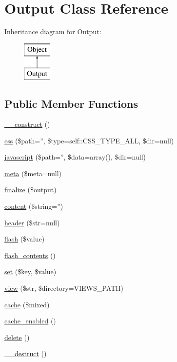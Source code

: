 \hypertarget{class_output}{
\section{Output Class Reference}
\label{class_output}
}
Inheritance diagram for Output:\begin{figure}[H]
\begin{center}
\leavevmode
\includegraphics[height=2.000000cm]{class_output}
\end{center}
\end{figure}
\subsection*{Public Member Functions}
\begin{DoxyCompactItemize}
\item 
\hyperlink{class_output_a095c5d389db211932136b53f25f39685}{\_\-\_\-construct} ()
\item 
\hyperlink{class_output_a81954b9eb41cfda9df0b6b866a92d6ba}{css} (\$path='', \$type=self::CSS\_\-TYPE\_\-ALL, \$dir=null)
\item 
\hyperlink{class_output_ac359bc09a619bc17984e72505da60e8a}{javascript} (\$path='', \$data=array(), \$dir=null)
\item 
\hyperlink{class_output_a53d74dafd94eb89bcb6eb54b9c5c39b5}{meta} (\$meta=null)
\item 
\hyperlink{class_output_a32fb85f301f99b6e61c5e19270983152}{finalize} (\$output)
\item 
\hyperlink{class_output_a3b9d33e5e0610124f62fb427ac1bd754}{content} (\$string='')
\item 
\hyperlink{class_output_a5e542c1b4ed067be98a53c8b5f73d16d}{header} (\$str=null)
\item 
\hyperlink{class_output_a4dec29270c24c18fa09a1042ecf9e720}{flash} (\$value)
\item 
\hyperlink{class_output_a374032719c9ffd4a843553dcf7eb2b5c}{flash\_\-contents} ()
\item 
\hyperlink{class_output_aab787bd83f84f4215dceb35f7c305eee}{set} (\$key, \$value)
\item 
\hyperlink{class_output_a12d2fe718f58ee0cd88326fa7fca2009}{view} (\$str, \$directory=VIEWS\_\-PATH)
\item 
\hyperlink{class_output_ab746d2221c2e0f641e682508ab467387}{cache} (\$mixed)
\item 
\hyperlink{class_output_a4f6296d504ca22a410db3f32968dc38f}{cache\_\-enabled} ()
\item 
\hyperlink{class_output_a13bdffdd926f26b825ea57066334ff01}{delete} ()
\item 
\hyperlink{class_output_a421831a265621325e1fdd19aace0c758}{\_\-\_\-destruct} ()
\end{DoxyCompactItemize}
